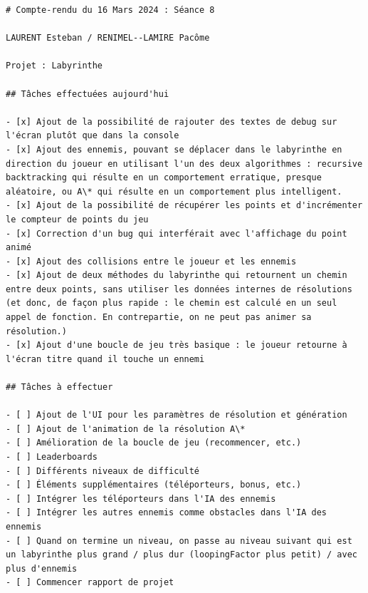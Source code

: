 \documentclass[12pt]{scrreprt} %
\begin{document}
\begin{verbatim}
# Compte-rendu du 16 Mars 2024 : Séance 8

LAURENT Esteban / RENIMEL--LAMIRE Pacôme

Projet : Labyrinthe

## Tâches effectuées aujourd'hui

- [x] Ajout de la possibilité de rajouter des textes de debug sur l'écran plutôt que dans la console
- [x] Ajout des ennemis, pouvant se déplacer dans le labyrinthe en direction du joueur en utilisant l'un des deux algorithmes : recursive backtracking qui résulte en un comportement erratique, presque aléatoire, ou A\* qui résulte en un comportement plus intelligent.
- [x] Ajout de la possibilité de récupérer les points et d'incrémenter le compteur de points du jeu
- [x] Correction d'un bug qui interférait avec l'affichage du point animé
- [x] Ajout des collisions entre le joueur et les ennemis
- [x] Ajout de deux méthodes du labyrinthe qui retournent un chemin entre deux points, sans utiliser les données internes de résolutions (et donc, de façon plus rapide : le chemin est calculé en un seul appel de fonction. En contrepartie, on ne peut pas animer sa résolution.)
- [x] Ajout d'une boucle de jeu très basique : le joueur retourne à l'écran titre quand il touche un ennemi

## Tâches à effectuer

- [ ] Ajout de l'UI pour les paramètres de résolution et génération
- [ ] Ajout de l'animation de la résolution A\*
- [ ] Amélioration de la boucle de jeu (recommencer, etc.)
- [ ] Leaderboards
- [ ] Différents niveaux de difficulté
- [ ] Éléments supplémentaires (téléporteurs, bonus, etc.)
- [ ] Intégrer les téléporteurs dans l'IA des ennemis
- [ ] Intégrer les autres ennemis comme obstacles dans l'IA des ennemis
- [ ] Quand on termine un niveau, on passe au niveau suivant qui est un labyrinthe plus grand / plus dur (loopingFactor plus petit) / avec plus d'ennemis
- [ ] Commencer rapport de projet

\end{verbatim}
\end{document}
